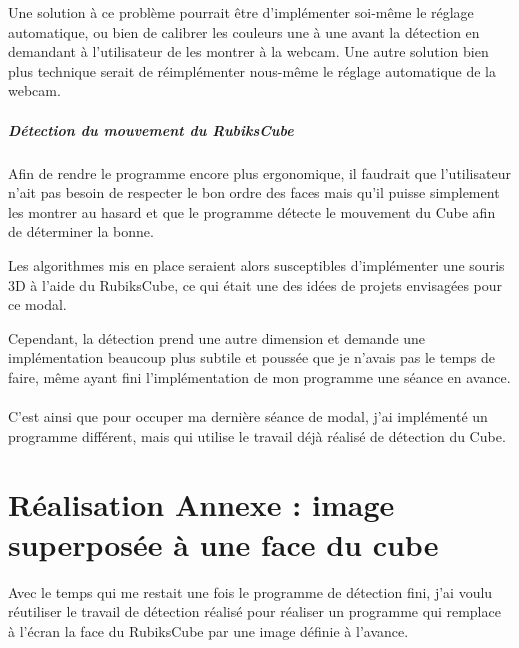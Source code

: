 \documentclass[a4paper,11pt]{article}
\begin{document}
Une solution à ce problème pourrait être d'implémenter soi-même le réglage automatique, ou bien de calibrer les 
couleurs une à une avant la détection en demandant à l'utilisateur de les montrer à la webcam. Une autre solution
bien plus technique serait de réimplémenter nous-même le réglage automatique de la webcam.

\subparagraph{Détection du mouvement du RubiksCube}
Afin de rendre le programme encore plus ergonomique, il faudrait que l'utilisateur n'ait pas besoin de respecter
le bon ordre des faces mais qu'il puisse simplement les montrer au hasard et que le programme détecte le 
mouvement du Cube afin de déterminer la bonne. 

Les algorithmes mis en place seraient alors susceptibles d'implémenter une souris 3D à l'aide du RubiksCube,
ce qui était une des idées de projets envisagées pour ce modal.

Cependant, la détection prend une autre dimension et demande une implémentation beaucoup plus subtile et poussée
que je n'avais pas le temps de faire, même ayant fini l'implémentation de mon programme une séance en avance.

\paragraph{  }
C'est ainsi que pour occuper ma dernière séance de modal, j'ai implémenté un programme différent, mais qui
utilise le travail déjà réalisé de détection du Cube.

\section{Réalisation Annexe : image superposée à une face du cube}
Avec le temps qui me restait une fois le programme de détection fini, j'ai voulu réutiliser le travail de 
détection réalisé pour réaliser un programme qui remplace à l'écran la face du RubiksCube par une image définie
à l'avance.
\end{document}
